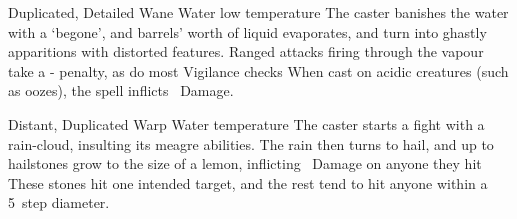 \ifodd\value{diceNo}

  {Duplicated, Detailed}%
  {Wane}%
  {Water}%
  {low temperature}%
  {The caster banishes the water with a `begone', and  barrels' worth of liquid evaporates, and turn into ghastly apparitions with distorted features.
  Ranged attacks firing through the vapour take a - penalty, as do most Vigilance checks}%
  {
  When cast on acidic creatures (such as oozes), the spell inflicts \showDam\ Damage.}

\else

  {Distant, Duplicated}%
  {Warp}%
  {Water}%
  {temperature}%
  {The caster starts a fight with a rain-cloud, insulting its meagre abilities.
  The rain then turns to hail, and up to  hailstones grow to the size of a lemon, inflicting \showDam~Damage on anyone they hit}%
  {These stones hit one intended target, and the rest tend to hit anyone within a 5~\gls{step} diameter.}

\fi
{}
